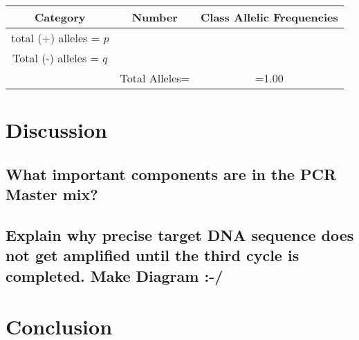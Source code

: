 \documentclass[paper=a4, fontsize=11pt]{scrartcl} %
\numberwithin{equation}{section} %
\numberwithin{figure}{section} %
\numberwithin{table}{section} %
\begin{document}
\begin{tabular}{|c|c|c|}
	
	\hline Category  & Number & Class Allelic Frequencies  \\ 
	\hline  total (+) alleles = $p$&  &  \\ 
	\hline  Total (-) alleles = $q$ &  &  \\ 

	\hline  & Total Alleles= & =1.00  \\ 
	\hline 
\end{tabular} 

\section{Discussion}
\subsection{What important components are in the PCR Master mix?}
\subsection{Explain why precise target DNA sequence does not get amplified until the third cycle is completed. Make Diagram :-/}


\section{Conclusion}

\end{document}
